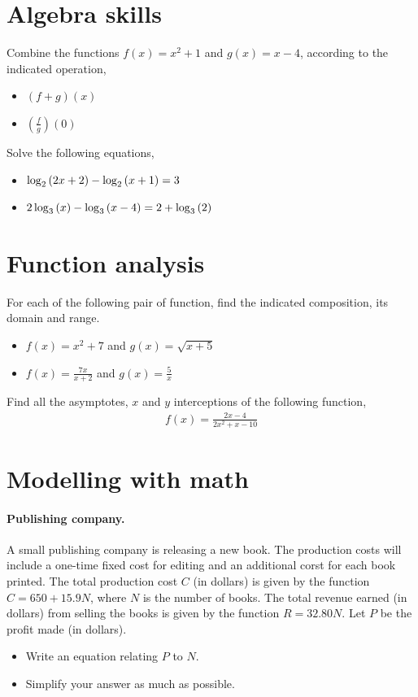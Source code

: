\documentclass[a4paper]{tufte-handout} %
\begin{document}
\section{Algebra skills}

Combine the functions $f(x) = x^2+1$ and $g(x)=x-4$, according to the indicated operation,
\begin{itemize}
    \item $(f+g)(x)$
    \item $\left(\frac{f}{g}\right)\left(0\right)$
\end{itemize}

Solve the following equations,
\begin{itemize}
    \item $\log_2\qty(2x+2) - \log_2\qty(x+1) = 3$
    \item $2\log_3\qty(x) - \log_3\qty(x-4) = 2+\log_3\qty(2)$
\end{itemize}

\section{Function analysis}

For each of the following pair of function, find the indicated composition, its domain and range.

\begin{itemize}
    \item $f(x) = x^2 + 7$ and $g(x)=\sqrt{x+5}$
    \item $f(x) = \frac{7x}{x+2}$ and $g(x) = \frac{5}{x}$
\end{itemize}

Find all the asymptotes, $x$ and $y$ interceptions of the following function,
\begin{gather*}
    f(x) = \frac{2x-4}{2x^2+x-10}
\end{gather*}


\section{Modelling with math}

\paragraph{Publishing company.} A small publishing company is releasing a new book.
The production costs will include a one-time fixed cost for editing and an additional corst for each book printed.
The total production cost $C$ (in dollars) is given by the function $C=650+15.9N$, where $N$ is the number of books.
The total revenue earned (in dollars) from selling the books is given by the function $R=32.80N$.
Let $P$ be the profit made (in dollars). 
\begin{itemize}
    \item Write an equation relating $P$ to $N$. 
    \item Simplify your answer as much as possible.
\end{itemize}
\end{document}

